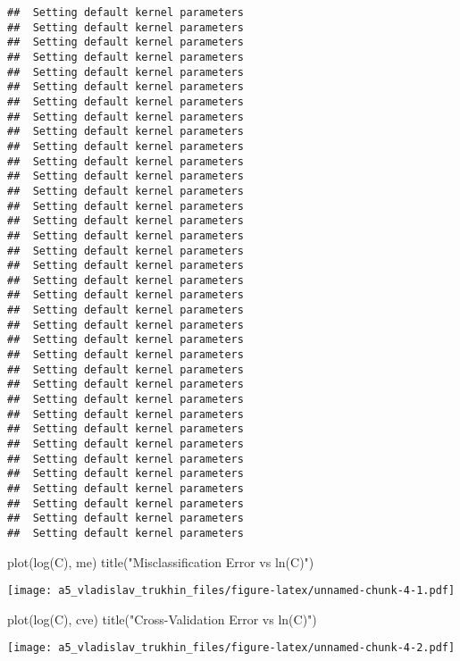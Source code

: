 \documentclass[
]{article}
\newenvironment{Shaded}{\begin{snugshade}}{\end{snugshade}}
\newcommand{\FunctionTok}[1]{\textcolor[rgb]{0.00,0.00,0.00}{#1}}
\newcommand{\NormalTok}[1]{#1}
\newcommand{\StringTok}[1]{\textcolor[rgb]{0.31,0.60,0.02}{#1}}
\begin{document}
\begin{verbatim}
##  Setting default kernel parameters  
##  Setting default kernel parameters  
##  Setting default kernel parameters  
##  Setting default kernel parameters  
##  Setting default kernel parameters  
##  Setting default kernel parameters  
##  Setting default kernel parameters  
##  Setting default kernel parameters  
##  Setting default kernel parameters  
##  Setting default kernel parameters  
##  Setting default kernel parameters  
##  Setting default kernel parameters  
##  Setting default kernel parameters  
##  Setting default kernel parameters  
##  Setting default kernel parameters  
##  Setting default kernel parameters  
##  Setting default kernel parameters  
##  Setting default kernel parameters  
##  Setting default kernel parameters  
##  Setting default kernel parameters  
##  Setting default kernel parameters  
##  Setting default kernel parameters  
##  Setting default kernel parameters  
##  Setting default kernel parameters  
##  Setting default kernel parameters  
##  Setting default kernel parameters  
##  Setting default kernel parameters  
##  Setting default kernel parameters  
##  Setting default kernel parameters  
##  Setting default kernel parameters  
##  Setting default kernel parameters  
##  Setting default kernel parameters  
##  Setting default kernel parameters  
##  Setting default kernel parameters  
##  Setting default kernel parameters  
##  Setting default kernel parameters
\end{verbatim}

\begin{Shaded}
\begin{Highlighting}[]
\FunctionTok{plot}\NormalTok{(}\FunctionTok{log}\NormalTok{(C), me)}
\FunctionTok{title}\NormalTok{(}\StringTok{"Misclassification Error vs ln(C)"}\NormalTok{)}
\end{Highlighting}
\end{Shaded}

\texttt{[image: a5\_vladislav\_trukhin\_files/figure-latex/unnamed-chunk-4-1.pdf]}

\begin{Shaded}
\begin{Highlighting}[]
\FunctionTok{plot}\NormalTok{(}\FunctionTok{log}\NormalTok{(C), cve)}
\FunctionTok{title}\NormalTok{(}\StringTok{"Cross{-}Validation Error vs ln(C)"}\NormalTok{)}
\end{Highlighting}
\end{Shaded}

\texttt{[image: a5\_vladislav\_trukhin\_files/figure-latex/unnamed-chunk-4-2.pdf]}
\end{document}
